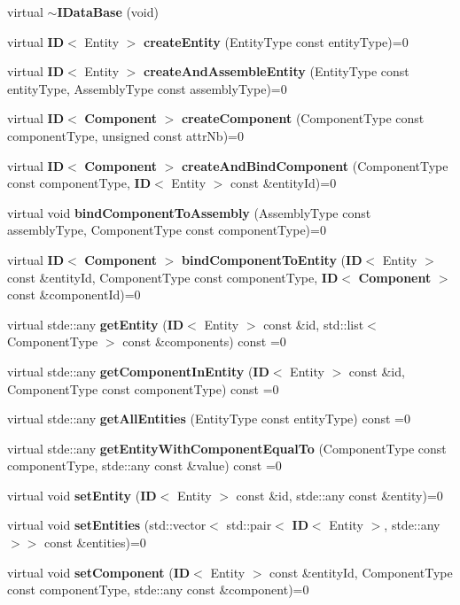 \begin{DoxyCompactItemize}
\item 
virtual {\bf $\sim$\+I\+Data\+Base} (void)
\item 
virtual {\bf ID}$<$ Entity $>$ {\bf create\+Entity} (Entity\+Type const entity\+Type)=0
\item 
virtual {\bf ID}$<$ Entity $>$ {\bf create\+And\+Assemble\+Entity} (Entity\+Type const entity\+Type, Assembly\+Type const assembly\+Type)=0
\item 
virtual {\bf ID}$<$ {\bf Component} $>$ {\bf create\+Component} (Component\+Type const component\+Type, unsigned const attr\+Nb)=0
\item 
virtual {\bf ID}$<$ {\bf Component} $>$ {\bf create\+And\+Bind\+Component} (Component\+Type const component\+Type, {\bf ID}$<$ Entity $>$ const \&entity\+Id)=0
\item 
virtual void {\bf bind\+Component\+To\+Assembly} (Assembly\+Type const assembly\+Type, Component\+Type const component\+Type)=0
\item 
virtual {\bf ID}$<$ {\bf Component} $>$ {\bf bind\+Component\+To\+Entity} ({\bf ID}$<$ Entity $>$ const \&entity\+Id, Component\+Type const component\+Type, {\bf ID}$<$ {\bf Component} $>$ const \&component\+Id)=0
\item 
virtual stde\+::any {\bf get\+Entity} ({\bf ID}$<$ Entity $>$ const \&id, std\+::list$<$ Component\+Type $>$ const \&components) const =0
\item 
virtual stde\+::any {\bf get\+Component\+In\+Entity} ({\bf ID}$<$ Entity $>$ const \&id, Component\+Type const component\+Type) const =0
\item 
virtual stde\+::any {\bf get\+All\+Entities} (Entity\+Type const entity\+Type) const =0
\item 
virtual stde\+::any {\bf get\+Entity\+With\+Component\+Equal\+To} (Component\+Type const component\+Type, stde\+::any const \&value) const =0
\item 
virtual void {\bf set\+Entity} ({\bf ID}$<$ Entity $>$ const \&id, stde\+::any const \&entity)=0
\item 
virtual void {\bf set\+Entities} (std\+::vector$<$ std\+::pair$<$ {\bf ID}$<$ Entity $>$, stde\+::any $>$$>$ const \&entities)=0
\item 
virtual void {\bf set\+Component} ({\bf ID}$<$ Entity $>$ const \&entity\+Id, Component\+Type const component\+Type, stde\+::any const \&component)=0
\end{DoxyCompactItemize}


